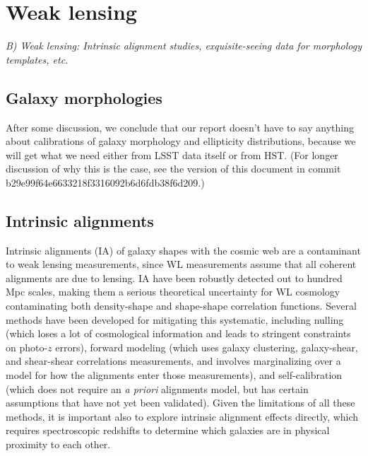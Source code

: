 \section{Weak lensing}
\label{sec:wl}

{\it B) Weak lensing: Intrinsic alignment studies, exquisite-seeing data
for morphology templates, etc.}

\subsection{Galaxy morphologies}

After some discussion, we conclude that our report doesn't have to say anything about calibrations
of galaxy morphology and ellipticity distributions, because we will get what we need either from
LSST data itself or from HST.  (For longer discussion of why this is the case, see the version of
this document in commit b29e99f64e6633218f3316092b6d6fdb38f6d209.)

\subsection{Intrinsic alignments}

Intrinsic alignments (IA) of galaxy shapes with the cosmic web are a contaminant to weak lensing
measurements, since WL measurements assume that all coherent alignments are due to lensing. IA have
been robustly detected out to hundred Mpc scales, making them a serious theoretical uncertainty for
WL cosmology contaminating both density-shape and shape-shape correlation functions.  Several
methods have been developed for mitigating this systematic, including nulling (which loses a lot of
cosmological information and leads to stringent constraints on photo-$z$ errors), forward modeling
(which uses galaxy clustering, galaxy-shear, and shear-shear correlations measurements, and involves
marginalizing over a model for how the alignments enter those measurements), and self-calibration
(which does not require an {\em a priori} alignments model, but has certain assumptions that have
not yet been validated).  Given the limitations of all these methods, it is important also to explore intrinsic alignment effects directly, which requires spectroscopic redshifts to determine which galaxies are in physical proximity to each other.


